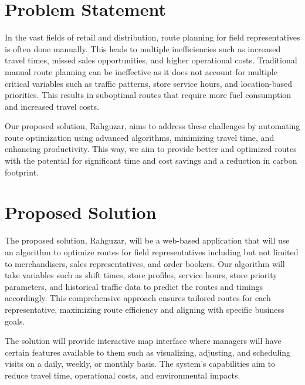 


\section{Problem Statement}

In the vast fields of retail and distribution, route planning for field representatives is often done manually. This leads to multiple inefficiencies such as increased travel times, missed sales opportunities, and higher operational costs. Traditional manual route planning can be ineffective as it does not account for multiple critical variables such as traffic patterns, store service hours, and location-based priorities. This results in suboptimal routes that require more fuel consumption and increased travel costs. 

Our proposed solution, Rahguzar, aims to address these challenges by automating route optimization using advanced algorithms, minimizing travel time, and enhancing productivity. This way, we aim to provide better and optimized routes with the potential for significant time and cost savings and a reduction in carbon footprint.

\section{Proposed Solution}

The proposed solution, Rahguzar, will be a web-based application that will use an algorithm to optimize routes for field representatives including but not limited to merchandisers, sales representatives, and order bookers. Our algorithm will take variables such as shift times, store profiles, service hours, store priority parameters, and historical traffic data to predict the routes and timings accordingly. This comprehensive approach ensures tailored routes for each representative, maximizing route efficiency and aligning with specific business goals. 

The solution will provide interactive map interface where managers will have certain features available to them such as visualizing, adjusting, and scheduling visits on a daily, weekly, or monthly basis. The system’s capabilities aim to reduce travel time, operational costs, and environmental impacts.

